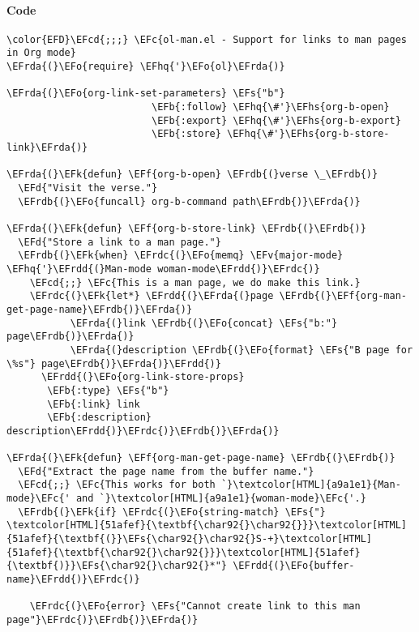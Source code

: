 \documentclass[a4wide,10pt]{article}
\newcommand{\EFc}[1]{\textcolor{EFc}{#1}} %
\newcommand{\EFcd}[1]{\textcolor{EFcd}{#1}} %
\newcommand{\EFs}[1]{\textcolor{EFs}{#1}} %
\newcommand{\EFd}[1]{\textcolor{EFd}{#1}} %
\newcommand{\EFk}[1]{\textcolor{EFk}{#1}} %
\newcommand{\EFb}[1]{\textcolor{EFb}{#1}} %
\newcommand{\EFf}[1]{\textcolor{EFf}{#1}} %
\newcommand{\EFv}[1]{\textcolor{EFv}{#1}} %
\newcommand{\EFo}[1]{\textcolor{EFo}{#1}} %
\newcommand{\EFhq}[1]{\textcolor{EFhq}{#1}} %
\newcommand{\EFhs}[1]{\textcolor{EFhs}{#1}} %
\newcommand{\EFrda}[1]{\textcolor{EFrda}{#1}} %
\newcommand{\EFrdb}[1]{\textcolor{EFrdb}{#1}} %
\newcommand{\EFrdc}[1]{\textcolor{EFrdc}{#1}} %
\newcommand{\EFrdd}[1]{\textcolor{EFrdd}{#1}} %
\begin{document}
\paragraph{Code}
\label{sec:org62ab8f4}
\begin{Code}
\begin{Verbatim}
\color{EFD}\EFcd{;;;} \EFc{ol-man.el - Support for links to man pages in Org mode}
\EFrda{(}\EFo{require} \EFhq{'}\EFo{ol}\EFrda{)}

\EFrda{(}\EFo{org-link-set-parameters} \EFs{"b"}
                         \EFb{:follow} \EFhq{\#'}\EFhs{org-b-open}
                         \EFb{:export} \EFhq{\#'}\EFhs{org-b-export}
                         \EFb{:store} \EFhq{\#'}\EFhs{org-b-store-link}\EFrda{)}

\EFrda{(}\EFk{defun} \EFf{org-b-open} \EFrdb{(}verse \_\EFrdb{)}
  \EFd{"Visit the verse."}
  \EFrdb{(}\EFo{funcall} org-b-command path\EFrdb{)}\EFrda{)}

\EFrda{(}\EFk{defun} \EFf{org-b-store-link} \EFrdb{(}\EFrdb{)}
  \EFd{"Store a link to a man page."}
  \EFrdb{(}\EFk{when} \EFrdc{(}\EFo{memq} \EFv{major-mode} \EFhq{'}\EFrdd{(}Man-mode woman-mode\EFrdd{)}\EFrdc{)}
    \EFcd{;;} \EFc{This is a man page, we do make this link.}
    \EFrdc{(}\EFk{let*} \EFrdd{(}\EFrda{(}page \EFrdb{(}\EFf{org-man-get-page-name}\EFrdb{)}\EFrda{)}
           \EFrda{(}link \EFrdb{(}\EFo{concat} \EFs{"b:"} page\EFrdb{)}\EFrda{)}
           \EFrda{(}description \EFrdb{(}\EFo{format} \EFs{"B page for \%s"} page\EFrdb{)}\EFrda{)}\EFrdd{)}
      \EFrdd{(}\EFo{org-link-store-props}
       \EFb{:type} \EFs{"b"}
       \EFb{:link} link
       \EFb{:description} description\EFrdd{)}\EFrdc{)}\EFrdb{)}\EFrda{)}

\EFrda{(}\EFk{defun} \EFf{org-man-get-page-name} \EFrdb{(}\EFrdb{)}
  \EFd{"Extract the page name from the buffer name."}
  \EFcd{;;} \EFc{This works for both `}\textcolor[HTML]{a9a1e1}{Man-mode}\EFc{' and `}\textcolor[HTML]{a9a1e1}{woman-mode}\EFc{'.}
  \EFrdb{(}\EFk{if} \EFrdc{(}\EFo{string-match} \EFs{"} \textcolor[HTML]{51afef}{\textbf{\char92{}\char92{}}}\textcolor[HTML]{51afef}{\textbf{(}}\EFs{\char92{}\char92{}S-+}\textcolor[HTML]{51afef}{\textbf{\char92{}\char92{}}}\textcolor[HTML]{51afef}{\textbf{)}}\EFs{\char92{}\char92{}*"} \EFrdd{(}\EFo{buffer-name}\EFrdd{)}\EFrdc{)}

    \EFrdc{(}\EFo{error} \EFs{"Cannot create link to this man page"}\EFrdc{)}\EFrdb{)}\EFrda{)}


\end{Verbatim}
\end{Code}
\end{document}

